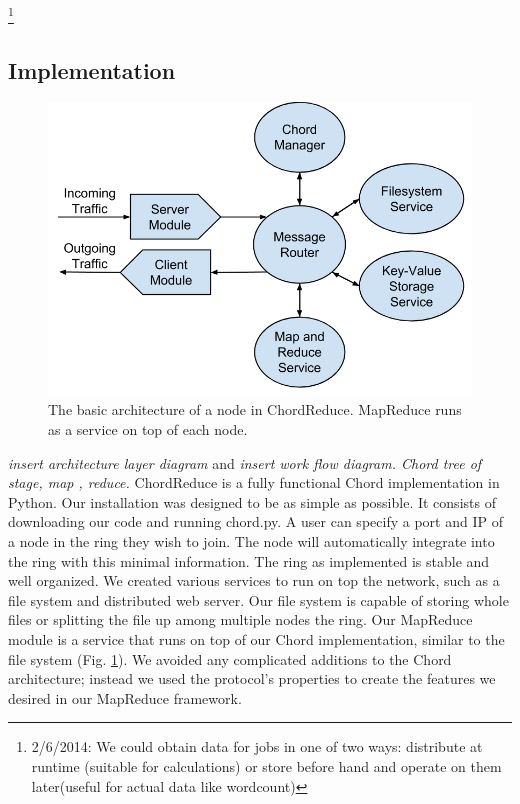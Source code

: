 \documentclass[10pt, conference, compsocconf]{IEEEtran}
\begin{document}
\footnote{2/6/2014:  We could obtain data for jobs in one of two ways:  distribute at runtime (suitable for calculations) or store before hand and operate on them later(useful for actual data like wordcount)}





\subsection{Implementation}

\begin{figure}
    \includegraphics[width=\linewidth]{crArch}
    \caption{The basic architecture of a node in ChordReduce.  MapReduce runs as a service on top of each node.}
    \label{crArch}
\end{figure}



\textit{insert architecture layer diagram }  and \textit{insert work flow diagram.  Chord tree of stage, map , reduce.}
ChordReduce is a fully functional Chord implementation in Python.  Our installation was designed to be as simple as possible.  It consists of downloading our code \cite{code} and running chord.py.  A user can specify a port and IP of a node in the ring they wish to join.  The node will automatically integrate into the ring with this minimal information.  The ring as implemented is stable and well organized.  We created various services to run on top the network, such as a file system and distributed web server.  Our file system is capable of storing whole files or splitting the file up among multiple nodes the ring.  Our MapReduce module is a service that runs on top of our Chord implementation, similar to the file system (Fig. \ref{crArch}).  We avoided any complicated additions to the Chord architecture; instead we used the protocol's properties to create the features we desired in our MapReduce framework. 
  
\end{document}
